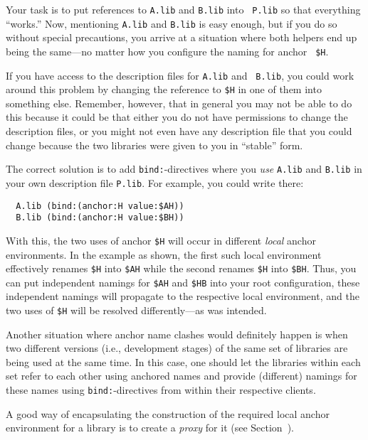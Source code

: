 Your task is to put references to {\tt A.lib} and {\tt B.lib} into {\tt
P.lib} so that everything ``works.''  Now, mentioning {\tt A.lib} and
{\tt B.lib} is easy enough, but if you do so without special
precautions, you arrive at a situation where both helpers end up being
the same---no matter how you configure the naming for anchor {\tt
\$H}.

If you have access to the description files for {\tt A.lib} and {\tt
B.lib}, you could work around this problem by changing the reference to
{\tt \$H} in one of them into something else.  Remember, however, that
in general you may not be able to do this because it could be that
either you do not have permissions to change the description files, or
you might not even have any description file that you could change
because the two libraries were given to you in ``stable'' form.

The correct solution is to add {\tt bind:}-directives where you {\em
use} {\tt A.lib} and {\tt B.lib} in your own description file {\tt P.lib}.
For example, you could write there:

\begin{verbatim}
  A.lib (bind:(anchor:H value:$AH))
  B.lib (bind:(anchor:H value:$BH))
\end{verbatim}

With this, the two uses of anchor {\tt \$H} will occur in different
{\em local} anchor environments.  In the example as shown, the first
such local environment effectively renames {\tt \$H} into {\tt \$AH}
while the second renames {\tt \$H} into {\tt \$BH}. Thus, you can put
independent namings for {\tt \$AH} and {\tt \$HB} into your root
configuration, these independent namings will propagate to the
respective local environment, and the two uses of {\tt \$H} will be
resolved differently---as was intended.

Another situation where anchor name clashes would definitely happen is
when two different versions (i.e., development stages) of the same set
of libraries are being used at the same time.  In this case, one
should let the libraries within each set refer to each other using
anchored names and provide (different) namings for these names using
{\tt bind:}-directives from within their respective clients.

A good way of encapsulating the construction of the required local
anchor environment for a library is to create a {\em proxy} for it
(see Section~).
